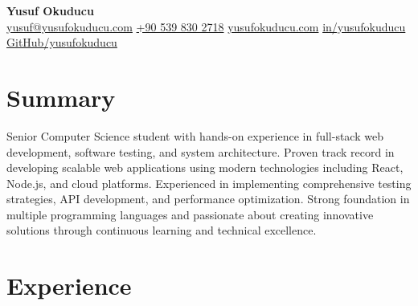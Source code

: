 \documentclass[10pt,a4paper]{extarticle}
\begin{document}
\begin{center}
    \begin{minipage}{\textwidth}
        \centering
        {\LARGE\textbf{Yusuf Okuducu}}\\[20pt]
        \href{mailto:yusuf@yusufokuducu.com}{yusuf@yusufokuducu.com} \quad
        \href{tel:+905398302718}{+90 539 830 2718} \quad
        \href{https://yusufokuducu.com}{yusufokuducu.com} \quad
        \href{https://linkedin.com/in/yusufokuducu}{in/yusufokuducu} \quad
        \href{https://github.com/yusufokuducu}{GitHub/yusufokuducu}
    \end{minipage}
\end{center}

\vspace{9pt}

\section{Summary}
Senior Computer Science student with hands-on experience in full-stack web development, 
software testing, and system architecture. Proven track record in developing scalable 
web applications using modern technologies including React, Node.js, and cloud platforms. 
Experienced in implementing comprehensive testing strategies, API development, and 
performance optimization. Strong foundation in multiple programming languages and 
passionate about creating innovative solutions through continuous learning and 
technical excellence.

\vspace{9pt}

\section{Experience}
\end{document}
